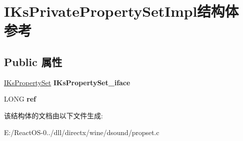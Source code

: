 \hypertarget{struct_i_ks_private_property_set_impl}{}\section{I\+Ks\+Private\+Property\+Set\+Impl结构体 参考}
\label{struct_i_ks_private_property_set_impl}
\subsection*{Public 属性}
\begin{DoxyCompactItemize}
\item 
\mbox{\label{struct_i_ks_private_property_set_impl_a7d21b348dc075d71438c26e85678bf40}} 
\hyperlink{interface_i_ks_property_set}{I\+Ks\+Property\+Set} {\bfseries I\+Ks\+Property\+Set\+\_\+iface}
\item 
\mbox{\label{struct_i_ks_private_property_set_impl_a44d1776fee0cc7637291378de9e69e6d}} 
L\+O\+NG {\bfseries ref}
\end{DoxyCompactItemize}


该结构体的文档由以下文件生成\+:\begin{DoxyCompactItemize}
\item 
E\+:/\+React\+O\+S-\/0../dll/directx/wine/dsound/propset.\+c\end{DoxyCompactItemize}
